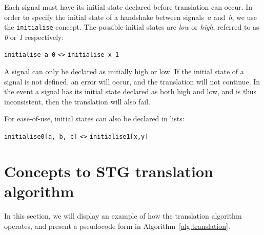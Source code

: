 \documentclass[british, 10pt, conference, compsocconf]{IEEEtran}
\begin{document}
Each signal must have its initial state declared before translation can occur. 
In order to specify the initial state of a handshake between signals~$a$
and~$b$, we use the \texttt{initialise} concept.
The possible initial states are \emph{low} or \emph{high}, referred to as 
\emph{0} or \emph{1} respectively:

\vspace{-1mm}

\begin{center}
   \texttt{initialise a 0} \texttt{<>} \texttt{initialise x 1}
\end{center}

\vspace{-1mm}

\noindent A signal can only be declared as initially high or low. If the 
initial state of a signal is not defined, an error will occur, and the 
translation will not continue. In the event a signal has its 
initial state declared as both high and low, and is thus inconsistent, then the translation will also fail.

For ease-of-use, initial states can also be declared in lists:

\vspace{-1mm}

\begin{center}
\texttt{initialise0[a, b, c]} \texttt{<>} \texttt{initialise1[x,y]}
\end{center}


\section{Concepts to STG translation algorithm\label{sec:algorithm}}


In this section, we will display an example of how the translation algorithm 
operates, and present a pseudocode form in Algorithm~\ref{alg:translation}. 

\vspace{-2mm}
\end{document}

